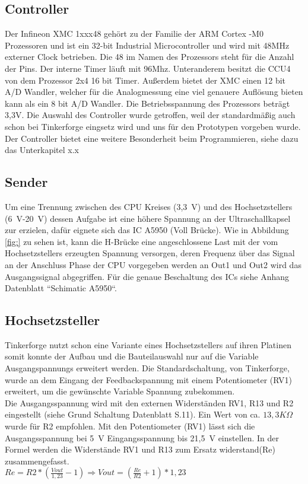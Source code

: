 \subsection{Controller}
Der Infineon XMC 1xxx48 gehört zu der Familie der ARM Cortex -M0 Prozessoren und ist ein 32-bit Industrial Microcontroller und wird mit 48MHz externer Clock betrieben. Die 48 im Namen des Prozessors steht für die Anzahl der Pins. Der interne Timer läuft mit 96Mhz. Unteranderem besitzt die CCU4 von dem Prozessor 2x4 16 bit Timer. Außerdem bietet der XMC einen 12 bit A/D Wandler, welcher für die Analogmessung eine viel genauere Auflösung bieten kann als ein 8 bit A/D Wandler. Die Betriebsspannung des Prozessors beträgt 3,3V. Die Auswahl des Controller wurde getroffen, weil der standardmäßig auch schon bei Tinkerforge eingsetz wird und uns für den Prototypen vorgeben wurde. Der Controller bietet eine weitere Besonderheit beim Programmieren, siehe dazu das Unterkapitel x.x\\


\subsection{Sender}%
Um eine Trennung zwischen des CPU Kreises (3,3~V) und des Hochsetzstellers (6~V-20~V) dessen Aufgabe ist eine höhere Spannung an der Ultraschallkapsel zur erzielen, dafür eignete sich das IC A5950 (Voll Brücke).
Wie in Abbildung \ref{fig:} zu sehen ist, kann die H-Brücke eine angeschlossene Last mit der vom Hochsetzstellers erzeugten Spannung versorgen, deren Frequenz über das Signal an der Anschluss Phase der CPU vorgegeben werden an Out1 und Out2 wird das Ausgangssignal abgegriffen. Für die genaue Beschaltung des ICs siehe Anhang Datenblatt “Schimatic A5950“.


\subsection{Hochsetzsteller}%

Tinkerforge nutzt schon eine Variante eines Hochsetzstellers auf ihren Platinen somit konnte der Aufbau und die Bauteilauswahl nur auf die Variable Ausgangspannungs erweitert werden. Die Standardschaltung, von Tinkerforge, wurde an dem Eingang der Feedbackspannung mit einem Potentiometer (RV1) erweitert, um die gewünschte Variable Spannung zubekommen.\\
Die Ausgangsspannung wird mit den externen Widerständen RV1, R13 und R2 eingestellt (siehe Grund Schaltung Datenblatt S.11). Ein Wert von ca. \(\displaystyle 13,3 K\Omega \) wurde für R2 empfohlen. Mit den Potentiometer (RV1) lässt sich die Ausgangsspannung bei 5~V Eingangsspannung bis 21,5~V einstellen. In der Formel werden die Widerstände RV1 und R13 zum Ersatz widerstand(Re) zusammengefasst.
\onehalfspacing \\
\(\displaystyle Re=R2*\left(\frac{Vout}{1,23}-1\right) \Rightarrow Vout=\left(\frac{Re}{R2}+1\right)*1,23\) 
\singlespacing



